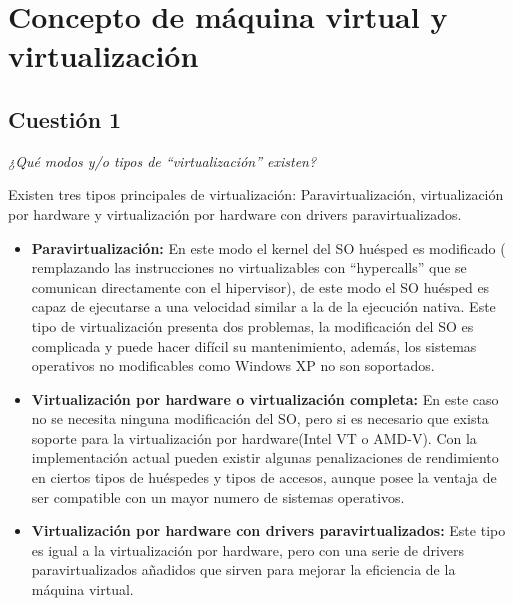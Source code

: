 



\maketitle %
\newpage %
\tableofcontents %
\listoffigures
\listoftables
\newpage

\section{Concepto de máquina virtual y virtualización}
\subsection{Cuestión 1} 
\textit{¿Qué modos y/o tipos de “virtualización” existen? } \newline 

Existen tres tipos principales de virtualización: Paravirtualización, virtualización por hardware  y virtualización por hardware con drivers paravirtualizados.


\begin{itemize}
    \item \textbf{Paravirtualización:} En este modo el kernel del SO huésped es modificado ( remplazando las instrucciones no virtualizables con ``hypercalls'' que se comunican directamente con el hipervisor),
de este modo el SO huésped es capaz de ejecutarse a una velocidad similar a la de la ejecución nativa. Este tipo de virtualización presenta dos problemas, la modificación del SO es complicada y puede hacer difícil su mantenimiento, además, los sistemas operativos no modificables como Windows XP no son soportados. \cite{vmware} \cite{vmoracle} 
    
    \item \textbf{Virtualización por hardware o virtualización completa:} En este caso no se necesita ninguna modificación del SO, pero si es necesario que exista soporte para la virtualización por hardware(Intel VT o AMD-V). Con la implementación actual pueden existir algunas penalizaciones de rendimiento en ciertos tipos de huéspedes y tipos de accesos, aunque posee la ventaja de ser compatible con un mayor numero de sistemas operativos. \cite{vmoracle}
    
    \item \textbf{Virtualización por hardware con drivers paravirtualizados:} Este tipo es igual a la virtualización por hardware, pero con una serie de drivers paravirtualizados añadidos que sirven para mejorar la eficiencia de la máquina virtual.\cite{vmoracle}
\end{itemize}


